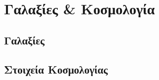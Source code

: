 \chapter{Γαλαξίες \& Κοσμολογία}
\label{ch:Chapter8}


\section{Γαλαξίες}

\section{Στοιχεία Κοσμολογίας}